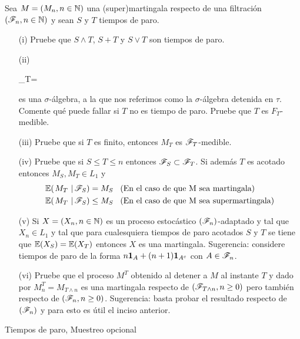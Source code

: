 \begin{problema}
	Sea $M=\left( M_n,n\in\mathbb{N}\right) $ una (super)martingala respecto de una filtraci\'on $\left( \mathscr{F}_n,n\in\mathbb{N}\right) $ y sean $S$ y $T$ tiempos de paro.
	
	\begin{enumerate}
					\item[(i)] 
						Pruebe que $S\wedge T$, $S+T$ y $S\vee T$ son tiempos de paro.
					
					\item[(ii)] 
						\begin{esn}
							\F_T=\set{A\in\F:A\cap\set{T\leq n}\in\F_n\text{ para toda } n}
						\end{esn}
						es una $\sigma$-\'algebra, a la que nos referimos como la $\sigma$-\'algebra 
						detenida en $\tau$. Comente qu\'e puede fallar si $T$ no es tiempo de paro. 
						Pruebe que $T$ es $F_T$-medible. 
					
					\item[(iii)] 
						Pruebe que si $T$ es finito, entonces $M_T$ es $\mathscr{F}_T$-medible.
					
					\item[(iv)] 
						Pruebe que si $S\leq T\leq n$ entonces $\mathscr{F}_S\subset\mathscr{F}_T$. Si adem\'as $T$ es acotado entonces $M_S, M_T\in L_1$ y 
						\begin{align*}
							\espc{M_T}{\F_S} = M_S &\mbox{\;\;\;(En el caso de que M sea martingala)} \\
							\espc{M_T}{\F_S}\leq M_S &\mbox{\;\;\;(En el caso de que M sea supermartingala)}                 	
						\end{align*}

					\item[(v)] 
						Si $X=\left( X_n,n\in\mathbb{N}\right) $ es un proceso estoc\'astico $\left( \mathscr{F}_n\right) $-adaptado y tal que $X_n\in L_1$ y tal que 
						para cualesquiera tiempos de paro acotados $S$ y $T$ se tiene que $\mathbb{E}\! \left( X_S \right)=\mathbb{E}\! \left( X_T \right)$ entonces $X$ es una 
						martingala. Sugerencia: considere tiempos de paro de la forma $n{\bf{1}}_{A}+(n+1){\bf{1}}_{A^c}$ con $A\in\mathscr{F}_n$.
						
					\item[(vi)]
						Pruebe que el proceso $M^T$ obtenido al detener a $M$ al instante $T$ y dado por $M^T_n=M_{T\wedge n}$ es una 
						martingala respecto de $\left( \mathscr{F}_{T\wedge n},n\geq 0\right) $ pero tambi\'en respecto de $\left( \mathscr{F}_{n},n\geq 0\right) $. 
						Sugerencia: basta probar el resultado respecto de $\left( \mathscr{F}_n\right) $ y para esto es \'util el inciso anterior.
	\end{enumerate}

Tiempos de paro, Muestreo opcional
\end{problema}

